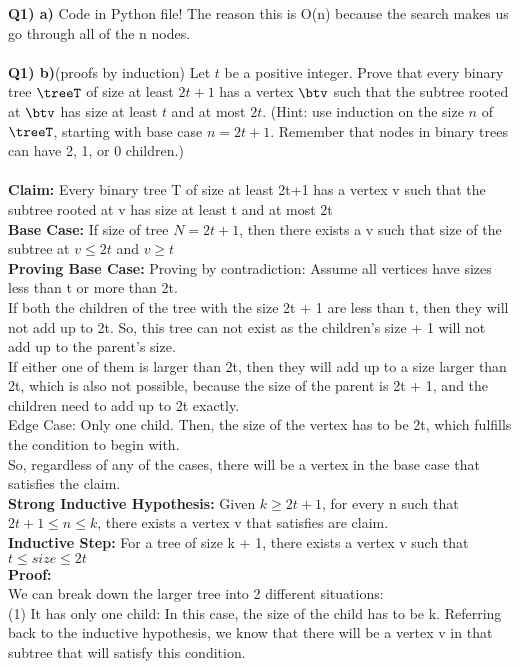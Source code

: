\documentclass[11pt]{article}
\begin{document}
\textbf{Q1) a)} Code in Python file! The reason this is O(n) because the search makes us go through all of the n nodes.
\\\\
\textbf{Q1) b)}(proofs by induction) Let $t$ be a positive integer. Prove that every binary tree $\treeT$ of size at least $2t+1$ has a vertex $\btv$ such that the subtree rooted at $\btv$ has size at least $t$ and at most $2t$.  (Hint: use induction on the size $n$ of $\treeT$, starting with base case $n=2t+1$.  Remember that nodes in binary trees can have 2, 1, or 0 children.) \label{part:induction-tsize}
    \\\\
    \textbf{Claim:} Every binary tree T of size at least 2t+1 has a vertex v such that the subtree rooted at v has size at least t and at most 2t
    \\ \textbf{Base Case:} If size of tree $N = 2t + 1$, then there exists a v such that size of the subtree at $v \leq 2t$ and $v \geq t$
    \\ \textbf{Proving Base Case:} Proving by contradiction: Assume all vertices have sizes less than t or more than 2t. 
    \\ If both the children of the tree with the size 2t + 1 are less than t, then they will not add up to 2t. So, this tree can not exist as the children's size + 1 will not add up to the parent's size.
    \\ If either one of them is larger than 2t, then they will add up to a size larger than 2t, which is also not possible, because the size of the parent is 2t + 1, and the children need to add up to 2t exactly.
    \\ Edge Case: Only one child. Then, the size of the vertex has to be 2t, which fulfills the condition to begin with.
    \\ So, regardless of any of the cases, there will be a vertex in the base case that satisfies the claim.
    \\ \textbf{Strong Inductive Hypothesis: } Given $k \geq 2t + 1$, for every n such that $2t + 1 \leq n \leq k$, there exists a vertex v that satisfies are claim. 
    \\ \textbf{Inductive Step: } For a tree of size k + 1, there exists a vertex v such that $t\leq size \leq 2t$
    \\ \textbf{Proof: }
    \\ We can break down the larger tree into 2 different situations:
    \\ (1) It has only one child: In this case, the size of the child has to be k. Referring back to the inductive hypothesis, we know that there will be a vertex v in that subtree that will satisfy this condition.
\end{document}
